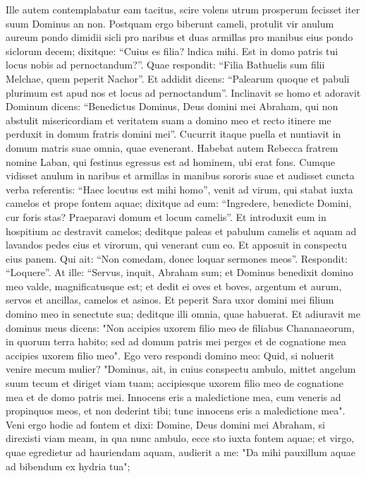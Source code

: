 \begin{biblechapter}
\verse Ille autem contemplabatur eam tacitus, scire volens utrum prosperum fecisset iter suum Dominus an non. 
\verse Postquam ergo biberunt cameli, protulit vir anulum aureum pondo dimidii sicli pro naribus et duas armillas pro manibus eius pondo siclorum decem; 
\verse dixitque: “Cuius es filia? lndica mihi. Est in domo patris tui locus nobis ad pernoctandum?”. 
\verse Quae respondit: “Filia Bathuelis sum filii Melchae, quem peperit Nachor”. 
\verse Et addidit dicens: “Palearum quoque et pabuli plurimum est apud nos et locus ad pernoctandum”. 
\verse Inclinavit se homo et adoravit Dominum 
\verse dicens: “Benedictus Dominus, Deus domini mei Abraham, qui non abstulit misericordiam et veritatem suam a domino meo et recto itinere me perduxit in domum fratris domini mei”. 
\verse Cucurrit itaque puella et nuntiavit in domum matris suae omnia, quae evenerant. 
\verse Habebat autem Rebecca fratrem nomine Laban, qui festinus egressus est ad hominem, ubi erat fons. 
\verse Cumque vidisset anulum in naribus et armillas in manibus sororis suae et audisset cuncta verba referentis: “Haec locutus est mihi homo”, venit ad virum, qui stabat iuxta camelos et prope fontem aquae; 
\verse dixitque ad eum: “Ingredere, benedicte Domini, cur foris stas? Praeparavi domum et locum camelis”. 
\verse Et introduxit eum in hospitium ac destravit camelos; deditque paleas et pabulum camelis et aquam ad lavandos pedes eius et virorum, qui venerant cum eo. 
\verse Et apposuit in conspectu eius panem. Qui ait: “Non comedam, donec loquar sermones meos”. Respondit: “Loquere”. 
\verse At ille: “Servus, inquit, Abraham sum; 
\verse et Dominus benedixit domino meo valde, magnificatusque est; et dedit ei oves et boves, argentum et aurum, servos et ancillas, camelos et asinos. 
\verse Et peperit Sara uxor domini mei filium domino meo in senectute sua; deditque illi omnia, quae habuerat. 
\verse Et adiuravit me dominus meus dicens: "Non accipies uxorem filio meo de filiabus Chananaeorum, in quorum terra habito; 
\verse sed ad domum patris mei perges et de cognatione mea accipies uxorem filio meo". 
\verse Ego vero respondi domino meo: Quid, si noluerit venire mecum mulier? 
\verse "Dominus, ait, in cuius conspectu ambulo, mittet angelum suum tecum et diriget viam tuam; accipiesque uxorem filio meo de cognatione mea et de domo patris mei. 
\verse Innocens eris a maledictione mea, cum veneris ad propinquos meos, et non dederint tibi; tunc innocens eris a maledictione mea". 
\verse Veni ergo hodie ad fontem et dixi: Domine, Deus domini mei Abraham, si direxisti viam meam, in qua nunc ambulo, 
\verse ecce sto iuxta fontem aquae; et virgo, quae egredietur ad hauriendam aquam, audierit a me: "Da mihi pauxillum aquae ad bibendum ex hydria tua"; 

\end{biblechapter}

